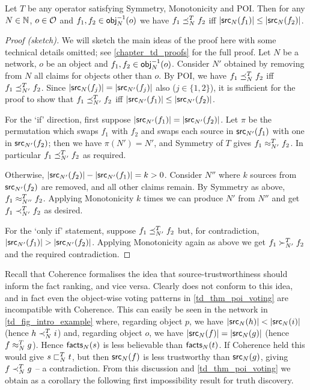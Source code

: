 \begin{theorem}
\label{td_thm_poi_voting}
Let $T$ be any operator satisfying Symmetry, Monotonicity and POI. Then for any
$N \in \mathbb{N}$, $o \in \mathcal{O}$ and $f_1, f_2 \in \mathsf{obj}_N^{-1}(o)$ we have $f_1 \preceq_N^T
f_2$ iff $|\mathsf{src}_N(f_1)| \le |\mathsf{src}_N(f_2)|$.
\end{theorem}

\begin{proof}[Proof (sketch)]

We will sketch the main ideas of the proof here with some technical details
omitted; see \cref{chapter_td_proofs} for the full proof. Let $N$ be a
network, $o$ be an object and $f_1, f_2 \in \mathsf{obj}_N^{-1}(o)$. Consider $N'$
obtained by removing from $N$ all claims for objects other than $o$. By POI, we
have $f_1 \preceq_N^T f_2$ iff $f_1 \preceq_{N'}^T f_2$.  Since $|\mathsf{src}_N(f_j)| =
|\mathsf{src}_{N'}(f_j)|$ also ($j \in \{1,2\}$), it is sufficient for the proof to
show that $f_1 \preceq_{N'}^T f_2$ iff $|\mathsf{src}_{N'}(f_1)| \le |\mathsf{src}_{N'}(f_2)|$.

For the `if' direction, first suppose $|\mathsf{src}_{N'}(f_1)| = |\mathsf{src}_{N'}(f_2)|$.
Let $\pi$ be the permutation which swaps $f_1$ with $f_2$ and swaps each source
in $\mathsf{src}_{N'}(f_1)$ with one in $\mathsf{src}_{N'}(f_2)$; then we have $\pi(N') = N'$,
and Symmetry of $T$ gives $f_1 \approx_{N'}^T f_2$. In particular $f_1 \preceq_{N'}^T
f_2$ as required.

Otherwise, $|\mathsf{src}_{N'}(f_2)| - |\mathsf{src}_{N'}(f_1)| = k > 0$. Consider $N''$ where
$k$ sources from $\mathsf{src}_{N'}(f_2)$ are removed, and all other claims remain. By
Symmetry as above, $f_1 \approx_{N''}^T f_2$. Applying Monotonicity $k$ times we
can produce $N'$ from $N''$ and get $f_1 \prec_{N'}^T f_2$ as desired.

For the `only if' statement, suppose $f_1 \preceq_{N'}^T f_2$ but, for
contradiction, $|\mathsf{src}_{N'}(f_1)| > |\mathsf{src}_{N'}(f_2)|$. Applying Monotonicity
again as above we get $f_1 \succ_{N'}^T f_2$ and the required contradiction.
\end{proof}

Recall that Coherence formalises the idea that source-trustworthiness should
inform the fact ranking, and vice versa. Clearly \voting{} does not conform to
this idea, and in fact even the object-wise voting patterns in
\cref{td_thm_poi_voting} are incompatible with Coherence. This can easily be seen
in the network in \cref{td_fig_intro_example} where, regarding object $p$, we have
$|\mathsf{src}_N(h)| < |\mathsf{src}_N(i)|$ (hence $h \prec^T_N i$) and, regarding object $o$,
we have $|\mathsf{src}_N(f)| = |\mathsf{src}_N(g)|$ (hence $f \approx^T_N g$). Hence $\mathsf{facts}_N(s)$
is less believable than $\mathsf{facts}_N(t)$. If Coherence held this would give $s
\sqsubset_N^T t$, but then $\mathsf{src}_N(f)$ is less trustworthy than $\mathsf{src}_N(g)$, giving
$f \prec_N^T g$ -- a contradiction. From this discussion and
\cref{td_thm_poi_voting} we obtain as a corollary the following first
impossibility result for truth discovery.

